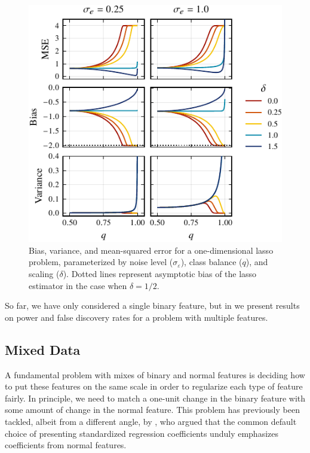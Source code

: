 \begin{figure}[htb]
  \centering
  \includegraphics[]{plots/binary_onedim_bias_var_lasso_small.pdf}
  \caption{%
    Bias, variance, and mean-squared error for a one-dimensional lasso problem,
    parameterized by noise level (\(\sigma_\varepsilon\)), class balance (\(q\)), and
    scaling (\(\delta\)). Dotted lines represent asymptotic bias of the lasso
    estimator in the case when \(\delta = 1/2\).}
  \label{fig:bias-var-onedim-lasso}
\end{figure}

So far, we have only considered a single binary feature, but in
 we present results on power and false discovery rates for a
problem with multiple features.

\subsection{Mixed Data}%
\label{sec:mixed-data}

A fundamental problem with mixes of binary and normal features is deciding how to put these
features on the same scale in order to regularize each type of feature fairly. In
principle, we need to match a one-unit change in the binary feature with some amount of
change in the normal feature. This problem has previously been tackled, albeit from a
different angle, by \citet{gelman2008}, who argued that the common default choice of
presenting standardized regression coefficients unduly emphasizes coefficients from normal
features.

